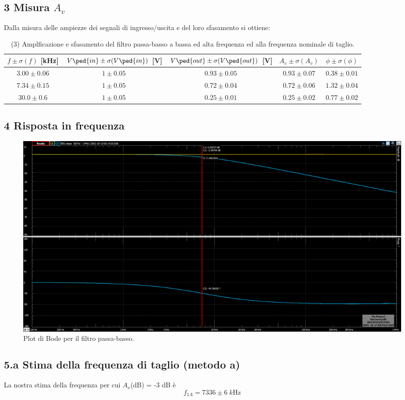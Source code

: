 \documentclass[10pt,a4paper]{article}
\begin{document}
\subsection*{3 Misura $A_v$}
Dalla misura delle ampiezze dei segnali di ingresso/uscita e del loro 
sfasamento si ottiene:
\begin{table}[h]
\centering
\begin{tabular}{|c|c|c|c|c|}
\hline 
$f \pm \sigma(f)$ [kHz] & $V\ped{in} \pm \sigma(V\ped{in})$ [V] 
                        & $V\ped{out} \pm \sigma(V\ped{out})$ [V] & $A_v \pm \sigma(A_v)$
& $\phi \pm \sigma(\phi)$ \\
\hline 
$3.00 \pm 0.06$ & $1 \pm 0.05$ & $0.93 \pm 0.05$ & $0.93 \pm 0.07$ & $0.38 \pm 0.01$ \\
$7.34 \pm 0.15$ & $1 \pm 0.05$ & $0.72 \pm 0.04$ & $0.72 \pm 0.06$ & $1.32 \pm 0.04$ \\
$30.0 \pm 0.6$ & $1 \pm 0.05$ & $0.25 \pm 0.01$ & $0.25 \pm 0.02$ & $0.77 \pm 0.02$ \\
\hline 
\end{tabular} 
\caption{(3) Amplficazione e sfasamento del filtro passa-basso a bassa ed alta 
frequenza ed alla frequenza nominale di taglio.
\label{tab: lpfmes}}
\end{table}

\subsection*{4 Risposta in frequenza}
\begin{figure}[htbp]
\centering
\includegraphics[scale=0.35]{rc2k10nF_new}
\caption{Plot di Bode per il filtro passa-basso.}
\end{figure}

\subsection*{5.a Stima della frequenza di taglio (metodo a)}
La nostra stima della frequenza per cui $A_v$(dB) = -3 dB \`e
\[
f_{1A} = 7336 \pm 6 \; \si{k\Hz}
\]
\end{document}
